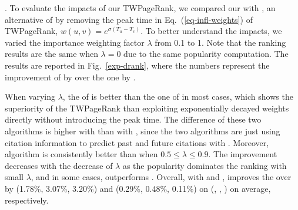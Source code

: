 


\newcommand{\drank}{\kw{DRank}}


.
To evaluate the impacts of our TWPageRank, we compared our \ensemblerank with \drank, an alternative of \ensemblerank by removing the peak time in  Eq.~(\ref{eq-infl-weights}) of  TWPageRank, \ie $w(u,v)=e^{\sigma(T_u-T_v)}$. %
To better understand the impacts, we varied the importance weighting factor $\lambda$ from 0.1 to 1. Note that the ranking results are the same when $\lambda=0$ due to the same popularity computation. The results are reported in Fig.~\ref{exp-drank}, where the numbers represent the improvement of \PairAcc by \ensemblerank over the one by \drank.


When varying $\lambda$, the \PairAcc of \ensemblerank is better than the one of \drank in most cases, which shows the superiority of the TWPageRank than exploiting exponentially decayed weights directly without introducing the peak time.
The \PairAcc difference of these two algorithms is higher with \recom than with \fcita, since the two algorithms are just using citation information to predict past and future citations with \fcita.
Moreover, algorithm \ensemblerank is consistently better than \drank when $0.5 \le \lambda \le 0.9$.
The improvement decreases with the decrease of $\lambda$ as the popularity dominates the ranking with small $\lambda$, and in some cases, \drank outperforms \ensemblerank. %
Overall, with \recom and \fcita, \ensemblerank improves the \PairAcc over \drank by (1.78\%, 3.07\%, 3.20\%) and (0.29\%, 0.48\%, 0.11\%) on (\aan, \aminer, \magdata) on average, respectively.

